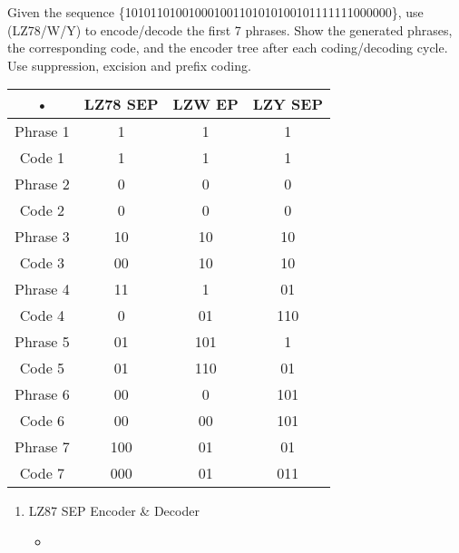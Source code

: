 
\begin{question}

Given the sequence \{101011010010001001101010100101111111000000\}, use (LZ78/W/Y) to
encode/decode the first 7 phrases. Show the generated phrases, the corresponding code, and the encoder tree after each coding/decoding cycle. Use suppression, excision and prefix coding.

\end{question}
\begin{solution}
\begin{tabular}{|c|c|c|c|}
\hline 
• & LZ78 SEP & LZW EP & LZY SEP \\ 
\hline 
Phrase 1 & 1 & 1 & 1 \\ 
\hline 
Code 1 & 1 & 1 & 1 \\ 
\hline 
Phrase 2 & 0 & 0 & 0 \\ 
\hline 
Code 2 & 0 & 0 & 0 \\ 
\hline 
Phrase 3 & 10 & 10 & 10 \\ 
\hline 
Code 3 & 00 & 10 & 10 \\ 
\hline 
Phrase 4 & 11 & 1 & 01 \\ 
\hline 
Code 4 & 0 & 01 & 110 \\ 
\hline 
Phrase 5 & 01 & 101 & 1 \\ 
\hline 
Code 5 & 01 & 110 & 01 \\ 
\hline 
Phrase 6 & 00 & 0 & 101 \\ 
\hline 
Code 6 & 00 & 00 & 101 \\ 
\hline 
Phrase 7 & 100 & 01 & 01 \\ 
\hline 
Code 7 & 000 & 01 & 011 \\ 
\hline 
\end{tabular} 

\begin{enumerate}
\item LZ87 SEP Encoder \& Decoder
\begin{itemize}
\item {} 


\end{itemize}
\end{enumerate}
\end{solution}
